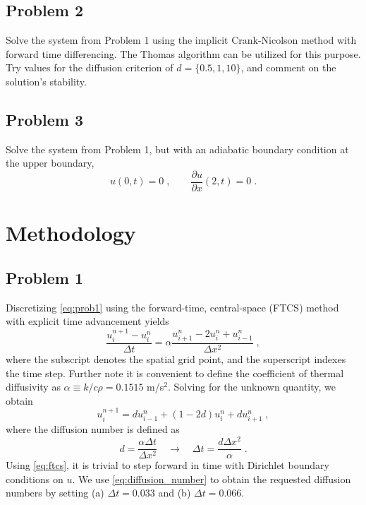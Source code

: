 \documentclass[11pt]{article}
\begin{document}
\subsection{Problem 2}

Solve the system from Problem 1 using the implicit Crank-Nicolson method with forward time differencing. The Thomas algorithm can be utilized for this purpose. Try values for the diffusion criterion of $d = \{0.5, 1, 10\}$, and comment on the solution's stability.

\subsection{Problem 3}

Solve the system from Problem 1, but with an adiabatic boundary condition at the upper boundary,
\begin{equation}
u(0,t) = 0 \;, \qquad \frac{\partial u}{\partial x}(2,t) = 0
\;.
\label{eq:prob3}
\end{equation}

\section{Methodology} %

\subsection{Problem 1}

Discretizing \eqref{eq:prob1} using the forward-time, central-space (FTCS) method with explicit time advancement yields
\begin{equation}
\frac{u_i^{n+1} - u_i^n}{\Delta t} = \alpha \frac{u_{i+1}^n - 2u_i^n + u_{i-1}^n}{\Delta x^2}
\;,
\end{equation}
where the subscript denotes the spatial grid point, and the superscript indexes the time step. Further note it is convenient to define the coefficient of thermal diffusivity as $\alpha \equiv k / c \rho = 0.1515$ m/s$^2$. Solving for the unknown quantity, we obtain
\begin{equation}
u_i^{n+1} = d u_{i-1}^n + (1-2d) u_i^n + d u_{i+1}^n
\;,
\label{eq:ftcs}
\end{equation}
where the diffusion number is defined as
\begin{equation}
d = \frac{\alpha \Delta t}{\Delta x^2} 
\quad
\rightarrow
\quad
\Delta t = \frac{d \Delta x^2}{\alpha}
\;.
\label{eq:diffusion_number}
\end{equation}
Using \eqref{eq:ftcs}, it is trivial to step forward in time with Dirichlet boundary conditions on $u$. We use \eqref{eq:diffusion_number} to obtain the requested diffusion numbers by setting (a) $\Delta t = 0.033$ and (b) $\Delta t = 0.066$.
\end{document}

